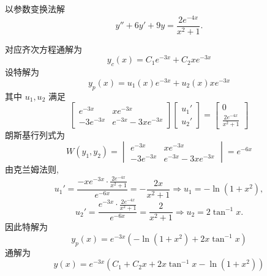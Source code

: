 \begin{questions}
    \question 以参数变换法解
    \[
    y'' + 6y' + 9y = \frac{2 e^{-4x}}{x^2+1}.
    \]
    \begin{solution}
        对应齐次方程通解为
        \[
        y_c(x) = C_1 e^{-3x} + C_2 x e^{-3x}
        \]
        设特解为
        \[
        y_p(x) = u_1(x) e^{-3x} + u_2(x) x e^{-3x}
        \]
        其中 $u_1, u_2$ 满足
        \[
        \begin{bmatrix}
        e^{-3x} & x e^{-3x} \\
        -3 e^{-3x} & e^{-3x} - 3x e^{-3x}
        \end{bmatrix}
        \begin{bmatrix} u_1' \\ u_2' \end{bmatrix}
        =
        \begin{bmatrix} 0 \\ \frac{2 e^{-4x}}{x^2 + 1} \end{bmatrix}
        \]
        朗斯基行列式为
        \[
        W(y_1, y_2) = \begin{vmatrix} e^{-3x} & x e^{-3x} \\ -3 e^{-3x} & e^{-3x} - 3x e^{-3x} \end{vmatrix} = e^{-6x}
        \]
        由克兰姆法则,
        \[
        u_1' = \frac{- x e^{-3x} \cdot \frac{2 e^{-4x}}{x^2 + 1}}{e^{-6x}} = -\frac{2x}{x^2 + 1} \Rightarrow u_1 = -\ln(1+x^2),
        \]
        \[
        u_2' = \frac{e^{-3x} \cdot \frac{2 e^{-4x}}{x^2 + 1}}{e^{-6x}} = \frac{2}{x^2+1} \Rightarrow u_2 = 2 \tan^{-1} x.
        \]
        因此特解为
        \[
        y_p(x) = e^{-3x} \left(-\ln(1+x^2) + 2 x \tan^{-1} x \right)
        \]
        通解为
        \[
        y(x) = e^{-3x} \left(C_1 + C_2 x + 2 x \tan^{-1} x - \ln(1+x^2) \right)
        \]
    \end{solution}


\end{questions}
